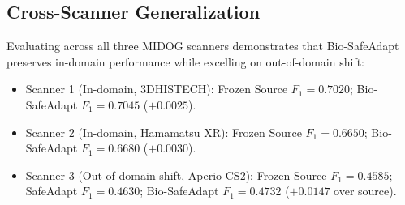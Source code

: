 \documentclass[conference]{IEEEtran}
\begin{document}
\subsection{Cross-Scanner Generalization}
Evaluating across all three MIDOG scanners demonstrates that Bio-SafeAdapt preserves in-domain performance while excelling on out-of-domain shift:
\begin{itemize}
    \item Scanner 1 (In-domain, 3DHISTECH): Frozen Source $F_1 = 0.7020$; Bio-SafeAdapt $F_1 = 0.7045$ ($+0.0025$).
    \item Scanner 2 (In-domain, Hamamatsu XR): Frozen Source $F_1 = 0.6650$; Bio-SafeAdapt $F_1 = 0.6680$ ($+0.0030$).
    \item Scanner 3 (Out-of-domain shift, Aperio CS2): Frozen Source $F_1 = 0.4585$; SafeAdapt $F_1 = 0.4630$; Bio-SafeAdapt $F_1 = 0.4732$ ($+0.0147$ over source).
\end{itemize}
\end{document}
